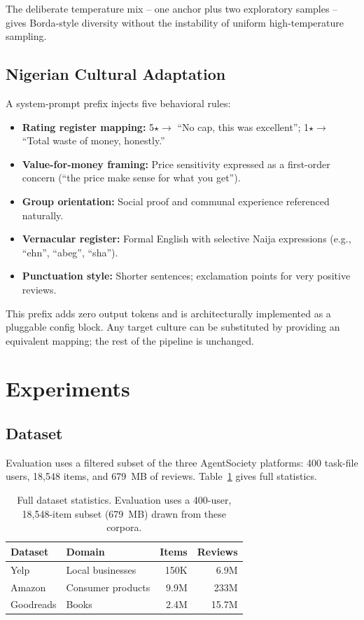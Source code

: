 \documentclass[11pt]{article}
\begin{document}
The deliberate temperature mix -- one anchor plus two exploratory samples --
gives Borda-style diversity without the instability of uniform high-temperature
sampling.

\subsection{Nigerian Cultural Adaptation}

A system-prompt prefix injects five behavioral rules:

\begin{itemize}
  \item \textbf{Rating register mapping:} 5$\star \to$ ``No cap, this was
    excellent''; 1$\star \to$ ``Total waste of money, honestly.''
  \item \textbf{Value-for-money framing:} Price sensitivity expressed as a
    first-order concern (``the price make sense for what you get'').
  \item \textbf{Group orientation:} Social proof and communal experience
    referenced naturally.
  \item \textbf{Vernacular register:} Formal English with selective Naija
    expressions (e.g., ``ehn'', ``abeg'', ``sha'').
  \item \textbf{Punctuation style:} Shorter sentences; exclamation points for
    very positive reviews.
\end{itemize}

This prefix adds zero output tokens and is architecturally implemented as a
pluggable config block.
Any target culture can be substituted by providing an equivalent mapping;
the rest of the pipeline is unchanged.

\section{Experiments}

\subsection{Dataset}

Evaluation uses a filtered subset of the three AgentSociety platforms: 400
task-file users, 18,548 items, and 679~MB of reviews. Table~\ref{tab:datasets}
gives full statistics.

\begin{table}[h]
\centering
\small
\begin{tabular}{llrr}
\toprule
\textbf{Dataset} & \textbf{Domain} & \textbf{Items} & \textbf{Reviews} \\
\midrule
Yelp        & Local businesses  & 150K  & 6.9M  \\
Amazon      & Consumer products & 9.9M  & 233M  \\
Goodreads   & Books             & 2.4M  & 15.7M \\
\bottomrule
\end{tabular}
\caption{Full dataset statistics. Evaluation uses a 400-user, 18,548-item
  subset (679~MB) drawn from these corpora.}
\label{tab:datasets}
\end{table}
\end{document}
